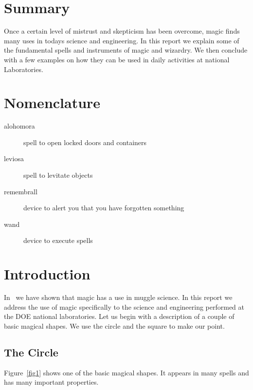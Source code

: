 \documentclass[pdf,ps2pdf,12pt,report,OUO]{SANDreport}
\begin{document}
    \clearpage
    \chapter*{Summary}
	Once a certain level of mistrust and skepticism has
	been overcome, magic finds many uses in todays science
	and engineering. In this report we explain some of the
	fundamental spells and instruments of magic and wizardry. We
	then conclude with a few examples on how they can be used
	in daily activities at national Laboratories.


    \clearpage
    \chapter*{Nomenclature}
    \begin{description}
	\item[alohomora]
	    spell to open locked doors and containers
	\item[leviosa]
	    spell to levitate objects
	\item[remembrall]
	    device to alert you that you have forgotten something
	\item[wand]
	    device to execute spells
    \end{description}


    \SANDmain		%

    \chapter{Introduction}
	\label{Intro}
	In~\cite{Potter} we have shown that magic has a use in
	muggle science. In this report we address the use of magic
	specifically to the science and engineering performed at the
	DOE national laboratories. Let us begin with a description
	of a couple of basic magical shapes. We use the circle and
	the square to make our point.

	\section{The Circle}
	    Figure~\ref{fig1} shows one of the basic magical shapes. It
	    appears in many spells and has many important properties.
\end{document}
